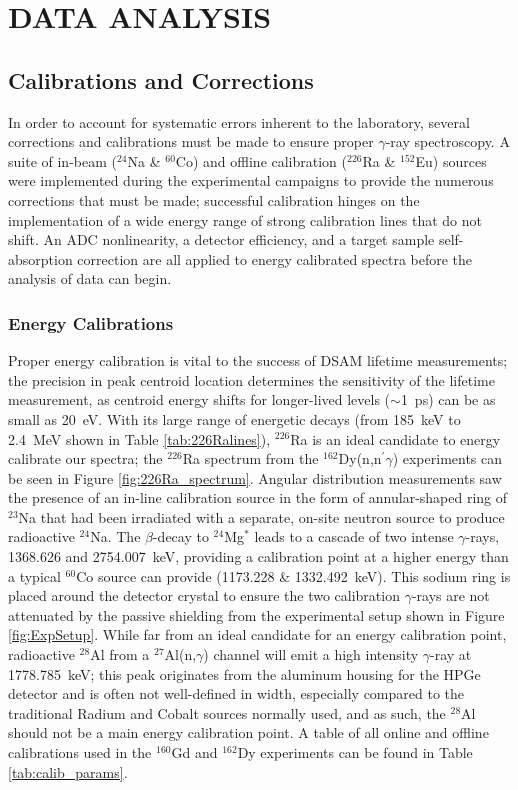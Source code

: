 %
%

\chapter{DATA ANALYSIS} \label{chp:Analysis}

\section{Calibrations and Corrections}
In order to account for systematic errors inherent to the laboratory, several corrections and calibrations must be made to ensure proper $\gamma$-ray spectroscopy. A suite of in-beam ($^{24}$Na \& $^{60}$Co) and offline calibration ($^{226}$Ra \& $^{152}$Eu) sources were implemented during the experimental campaigns to provide the numerous corrections that must be made; successful calibration hinges on the implementation of a wide energy range of strong calibration lines that do not shift. An ADC nonlinearity, a detector efficiency, and a target sample self-absorption correction are all applied to energy calibrated spectra before the analysis of data can begin.

\subsection{Energy Calibrations}\label{sec:energy_calibrations}
Proper energy calibration is vital to the success of DSAM lifetime measurements; the precision in peak centroid location determines the sensitivity of the lifetime  measurement, as centroid energy shifts for longer-lived levels ($\sim$1~ps) can be as small as 20~eV. With its large range of energetic decays (from 185~keV to 2.4~MeV shown in Table \ref{tab:226Ralines}), $^{226}$Ra is an ideal candidate to energy calibrate our spectra; the $^{226}$Ra spectrum from the $^{162}$Dy(n,n$^\prime\gamma$) experiments can be seen in Figure \ref{fig:226Ra_spectrum}. Angular distribution measurements saw the presence of an in-line calibration source in the form of annular-shaped ring of $^{23}$Na that had been irradiated with a separate, on-site neutron source to produce radioactive $^{24}$Na. The $\beta$-decay to $^{24}$Mg$^*$ leads to a cascade of two intense $\gamma$-rays, 1368.626 and 2754.007~keV, providing a calibration point at a higher energy than a typical $^{60}$Co source can provide (1173.228 \& 1332.492~keV). This sodium ring is placed around the detector crystal to ensure the two calibration $\gamma$-rays are not attenuated by the passive shielding from the experimental setup shown in Figure \ref{fig:ExpSetup}. While far from an ideal candidate for an energy calibration point, radioactive $^{28}$Al from a $^{27}$Al(n,$\gamma$) channel will emit a high intensity $\gamma$-ray at 1778.785~keV; this peak originates from the aluminum housing for the HPGe detector and is often not well-defined in width, especially compared to the traditional Radium and Cobalt sources normally used, and as such, the $^{28}$Al should not be a main energy calibration point. A table of all online and offline calibrations used in the $^{160}$Gd and $^{162}$Dy experiments can be found in Table \ref{tab:calib_params}. 

